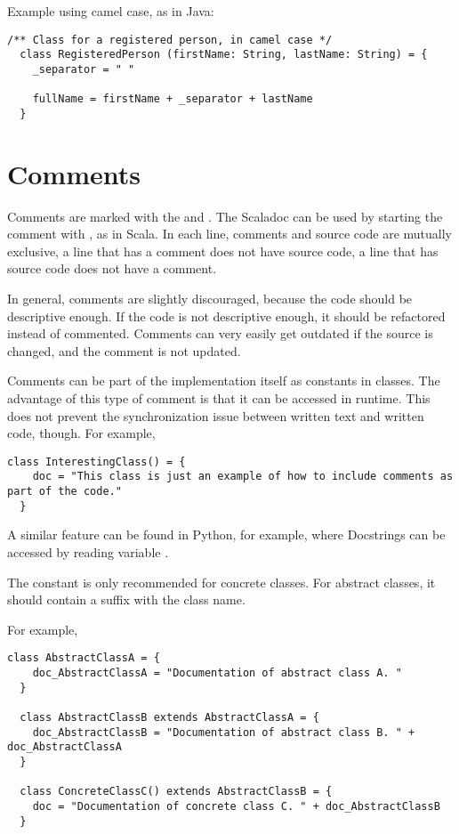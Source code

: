 Example using camel case, as in Java:
\begin{lstlisting}[label={lst:exampleExtendsCamelCase}]
  /** Class for a registered person, in camel case */
  class RegisteredPerson (firstName: String, lastName: String) = {
    _separator = " "

    fullName = firstName + _separator + lastName
  }
\end{lstlisting}


\section{Comments}

Comments are marked with the \srccode{/*} and  \srccode{*/}.
The Scaladoc can be used by starting the comment with \srccode{/**}, as in Scala.
In each line, comments and source code are mutually exclusive, a line that has a comment does not have source code, a line that has source code does not have a comment.

In general, comments are slightly discouraged, because the code should be descriptive enough.
If the code is not descriptive enough, it should be refactored instead of commented.
Comments can very easily get outdated if the source is changed, and the comment is not updated.

Comments can be part of the implementation itself as constants in classes.
The advantage of this type of comment is that it can be accessed in runtime.
This does not prevent the synchronization issue between written text and written code, though.
For example,

\begin{lstlisting}[label={lst:exampleClassWithComment}]
  class InterestingClass() = {
    doc = "This class is just an example of how to include comments as part of the code."
  }
\end{lstlisting}

A similar feature can be found in Python, for example, where Docstrings can be accessed by reading variable .

The  constant is only recommended for concrete classes.
For abstract classes, it should contain a suffix with the class name.

For example,
\begin{lstlisting}[label={lst:exampleAbstractAndConcreteClassesWithComment}]
  class AbstractClassA = {
    doc_AbstractClassA = "Documentation of abstract class A. "
  }

  class AbstractClassB extends AbstractClassA = {
    doc_AbstractClassB = "Documentation of abstract class B. " + doc_AbstractClassA
  }

  class ConcreteClassC() extends AbstractClassB = {
    doc = "Documentation of concrete class C. " + doc_AbstractClassB
  }
\end{lstlisting}

